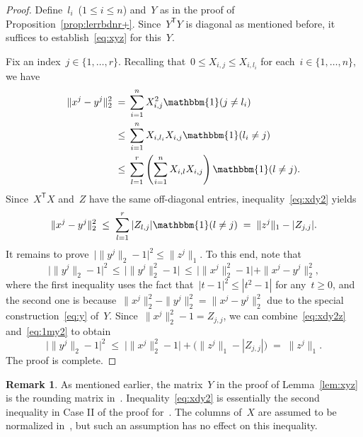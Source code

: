 \documentclass[11pt,a4paper]{article}  %
\theoremstyle{definition}
\newtheorem{remark}{Remark}%
\newcommand{\ind}{\mathbbm{1}}
\newcommand{\col}{r}
\newcommand{\trs}{{\scriptstyle{\mathsf{T}}}}
\begin{document}
\begin{proof}
    Define~$l_i$~($1\le i\le n$) and~$Y$ as in the proof of Proposition~\ref{prop:lerrbdnr+}.
    Since~$Y^\trs Y$ is diagonal as mentioned before, it suffices to establish~\eqref{eq:xyz} for this~$Y$.

    Fix an index~$j \in \{1, \dots, \col\}$.
    Recalling that~$ 0 \le X_{i, j} \le X_{i, l_i}$ for each~$i \in \{1, \dots, n\}$, we have
    \begin{equation}
        \label{eq:xdy2}
        \begin{split}
        \|x^j - y^j\|_2^2
        \;=\;
        &
        \sum_{i=1}^n X_{i,j}^2 \ind(j \neq l_i)
        \\
        \;\le\;
        &
         \sum_{i=1}^n X_{i,l_i}X_{i,j} \ind(l_i \neq j)
        \\
        \;\le\;
        &
        \sum_{l = 1}^\col \left(\sum_{i=1}^n X_{i,l}X_{i,j}\right)  \ind(l \neq j).
        \end{split}
    \end{equation}
    Since~$X^\trs X$ and~$Z$ have the same off-diagonal entries, inequality~\eqref{eq:xdy2} yields
    \begin{equation}
        \label{eq:xdy2z}
        \|x^j - y^j\|_2^2 \;\le\; \sum_{l = 1}^\col |Z_{l, j}| \ind(l \neq j)  \;=\; \|z^j\|_1 - |Z_{j,j}|.
    \end{equation}
    It remains to prove~$\big|\|y^j\|_2 - 1\big|^2 \le \|z^j\|_1$.
    To this end, note that
    \begin{equation}
        \label{eq:1my2}
        \big|\|y^j\|_2 - 1\big|^2
        \,\le\, \big|\|y^j\|_2^2 - 1\big|
        \,\le\,
        \big|\|x^j\|_2^2 - 1\big| + \|x^j - y^j\|_2^2,
    \end{equation}
    where the first inequality uses the fact that~$|t-1|^2 \le |t^2-1|$ for any~$t\ge 0$, and the
    second one is because~$\|x^j\|_2^2 - \|y^j\|_2^2 = \|x^j - y^j\|_2^2$ due to the special
    construction~\eqref{eq:y} of~$Y$.
    Since~$\|x^j\|_2^2 - 1 = Z_{j,j}$, we can combine~\eqref{eq:xdy2z} and~\eqref{eq:1my2} to obtain
    \begin{equation}
        \nonumber
        \big|\|y^j\|_2 - 1\big|^2 \;\le\;
        \big|\|x^j\|_2^2 - 1\big| +  \big(\|z^j\|_1 - |Z_{j,j}|\big) \;=\; \|z^j\|_1.
    \end{equation}
    The proof is complete.
\end{proof}

\begin{remark}
    \label{rem:jmwc}
    As mentioned earlier, the matrix~$Y$ in the proof of Lemma~\ref{lem:xyz} is the rounding
    matrix in~\cite[Procedure~3.1]{Jiang_Meng_Wen_Chen_2023}.
    Inequality~\eqref{eq:xdy2} is essentially the second inequality
    in Case II of the proof for~\cite[Lemma~3.2]{Jiang_Meng_Wen_Chen_2023}.
    The columns of~$X$ are assumed to be normalized in~\cite{Jiang_Meng_Wen_Chen_2023}, but
    such an assumption has no effect on this inequality.
\end{remark}
\end{document}
